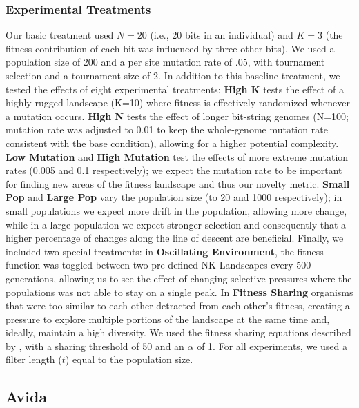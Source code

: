 \documentclass[letterpaper]{article}
\providecommand{\DIFaddtex}[1]{{\protect\color{blue}\uwave{#1}}} %
\providecommand{\DIFaddbegin}{} %
\providecommand{\DIFaddend}{} %
\providecommand{\DIFadd}[1]{\texorpdfstring{\DIFaddtex{#1}}{#1}} %
\begin{document}
\subsubsection{Experimental Treatments}
Our basic treatment used $N=20$ (i.e., 20 bits in an individual) and $K=3$ (the fitness contribution of each bit was influenced by three other bits).  We used a population size of 200 and a per site mutation rate of .05, with tournament selection and a tournament size of 2.
In addition to this baseline
treatment, we tested the effects of eight experimental treatments: \textbf{High K} tests the effect of a highly rugged landscape (K=10) where fitness is effectively randomized whenever a mutation occurs.  \textbf{High N} tests the effect of longer bit-string genomes (N=100; mutation rate was adjusted to 0.01 to keep the whole-genome mutation rate consistent with the base condition), allowing for a higher potential complexity.  \textbf{Low Mutation} and \textbf{High Mutation} test the effects of more extreme mutation rates (0.005 and 0.1 respectively); we expect the mutation rate to be important for finding new areas of the fitness landscape and thus our novelty metric.  \textbf{Small Pop} and \textbf{Large Pop} vary the population size (to 20 and 1000 respectively); in small populations we expect more drift in the population, allowing more change, while in a large population we expect stronger selection and consequently that a higher percentage of changes along the line of descent are beneficial.  Finally, we included two special treatments: in \textbf{Oscillating Environment}, the fitness function was toggled between two pre-defined NK Landscapes every 500 generations, allowing us to see the effect of changing selective pressures where the populations was not able to stay on a single peak.  In \textbf{Fitness Sharing} organisms that were too similar to each other detracted from each other's fitness, creating a pressure to explore multiple portions of the landscape at the same time and, ideally, maintain a high diversity. We used the fitness sharing equations described by \DIFaddbegin \DIFadd{Goldberg and Richardson }\DIFaddend \cite{goldberg_genetic_1987}, with a sharing threshold of 50 and an $\alpha$ of 1. For all experiments, we used a filter length ($t$) equal to the population size.

\subsection{Avida}
\end{document}
